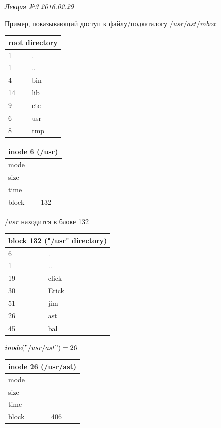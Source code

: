 \clearpage
\begin{flushright}
	\textit{Лекция №3}
	\textit{2016.02.29}
\end{flushright}

Пример, показывающий доступ к файлу/подкаталогу $/usr/ast/mbox$

\begin{table}[H]
\begin{tabular}{|l|l|}
\hline
\multicolumn{2}{|c|}{root directory} \\
\hline
1 & . \\
1 & .. \\
4 & bin \\
14 & lib \\
9 & etc \\
6 & usr \\
8 & tmp \\
\hline
\end{tabular}
\end{table}

\begin{table}[H]
\begin{tabular}{|l|l|}
\hline
\multicolumn{2}{|c|}{inode 6 (/usr)} \\
\hline
mode & \\
size & \\
time & \\
block & 132 \\
\hline
\end{tabular}
\end{table}

$/usr$ находится в блоке 132

\begin{table}[H]
\begin{tabular}{|l|l|}
\hline
\multicolumn{2}{|c|}{block 132 ("/usr" directory)} \\
\hline
6 & . \\
1 & .. \\
19 & click \\
30 & Erick \\
51 & jim \\
26 & ast \\
45 & bal \\
\hline
\end{tabular}
\end{table}

$inode("/usr/ast") = 26$

\begin{table}[H]
\begin{tabular}{|l|l|}
\hline
\multicolumn{2}{|c|}{inode 26 (/usr/ast)} \\
\hline
mode & \\
size & \\
time & \\
block & 406 \\
\hline
\end{tabular}
\end{table}

